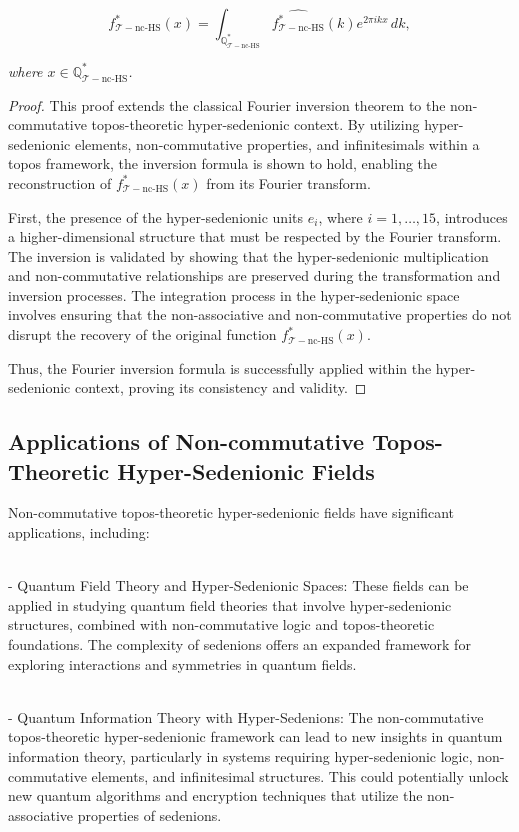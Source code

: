 \documentclass{article}
\begin{document}
\[
f_{\mathcal{T}-\text{nc-HS}}^*(x) = \int_{\mathbb{Q}_{\mathcal{T}-\text{nc-HS}}^*} \widehat{f_{\mathcal{T}-\text{nc-HS}}^*}(k) e^{2\pi i k x} \, dk,
\]

\textit{where \(x \in \mathbb{Q}_{\mathcal{T}-\text{nc-HS}}^*\).}

\begin{proof}
This proof extends the classical Fourier inversion theorem to the non-commutative topos-theoretic hyper-sedenionic context. By utilizing hyper-sedenionic elements, non-commutative properties, and infinitesimals within a topos framework, the inversion formula is shown to hold, enabling the reconstruction of \(f_{\mathcal{T}-\text{nc-HS}}^*(x)\) from its Fourier transform.

First, the presence of the hyper-sedenionic units \(e_i\), where \(i = 1, \dots, 15\), introduces a higher-dimensional structure that must be respected by the Fourier transform. The inversion is validated by showing that the hyper-sedenionic multiplication and non-commutative relationships are preserved during the transformation and inversion processes. The integration process in the hyper-sedenionic space involves ensuring that the non-associative and non-commutative properties do not disrupt the recovery of the original function \(f_{\mathcal{T}-\text{nc-HS}}^*(x)\).

Thus, the Fourier inversion formula is successfully applied within the hyper-sedenionic context, proving its consistency and validity.
\end{proof}

\subsection{Applications of Non-commutative Topos-Theoretic Hyper-Sedenionic Fields}
Non-commutative topos-theoretic hyper-sedenionic fields have significant applications, including:

{\ }\\
- Quantum Field Theory and Hyper-Sedenionic Spaces: These fields can be applied in studying quantum field theories that involve hyper-sedenionic structures, combined with non-commutative logic and topos-theoretic foundations. The complexity of sedenions offers an expanded framework for exploring interactions and symmetries in quantum fields.

{\ }\\
- Quantum Information Theory with Hyper-Sedenions: The non-commutative topos-theoretic hyper-sedenionic framework can lead to new insights in quantum information theory, particularly in systems requiring hyper-sedenionic logic, non-commutative elements, and infinitesimal structures. This could potentially unlock new quantum algorithms and encryption techniques that utilize the non-associative properties of sedenions.
\end{document}
